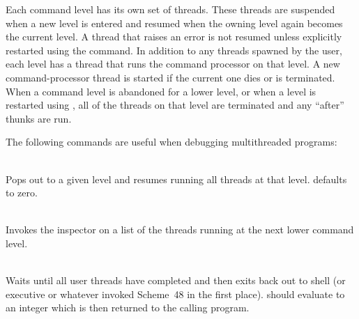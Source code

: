Each command level has its own set of threads.  These threads are suspended
 when a new level is entered and resumed when the owning level again becomes
 the current level.
A thread that raises an error is not resumed unless
 explicitly restarted using the  command.
In addition to any threads spawned by the user, each level has a thread
 that runs the command processor on that level.
A new command-processor thread is started if the current one
 dies or is terminated.
When a command level is abandoned for a lower level, or when
 a level is restarted using , all of the threads on that
 level are terminated and any  ``after'' thunks are run.

The following commands are useful when debugging multithreaded programs:
\begin{description}
\item {}\\
  Pops out to a given level and resumes running all threads at that level.
   defaults to zero.

\item {}\\
    Invokes the inspector on a list of the threads running at the
    next lower command level.

\item {}\\
    Waits until all user threads have completed and then
    exits back out to shell (or executive or whatever invoked Scheme~48
    in the first place).
     should evaluate to an integer which is then
    returned to the calling program.

%
%

\end{description}

